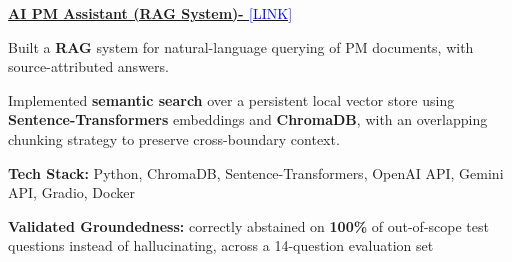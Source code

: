\begin{onecolentry}
\textbf{\underline{AI PM Assistant (RAG System)- }}\href{https://github.com/SkJishan04/AI-PM-Assistant-using-RAG}{\textcolor{blue}{[LINK]}}
\end{onecolentry}
\begin{onecolentry}
    \begin{highlights}
        \item Built a \textbf{RAG} system for natural-language querying of PM documents, with source-attributed answers.
        \item Implemented \textbf{semantic search} over a persistent local vector store using \textbf{Sentence-Transformers} embeddings and \textbf{ChromaDB}, with an overlapping chunking strategy to preserve cross-boundary context.
        \item \textbf{Tech Stack:} Python, ChromaDB, Sentence-Transformers, OpenAI API, Gemini API, Gradio, Docker
        \item \textbf{Validated Groundedness:} correctly abstained on \textbf{100\%} of out-of-scope test questions instead of hallucinating, across a 14-question evaluation set
    \end{highlights}
\end{onecolentry}